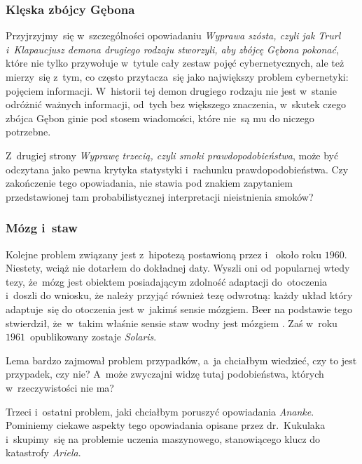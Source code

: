 \documentclass[10pt,t]{beamer}
\begin{document}
\begin{frame}
  \frametitle{Klęska zbójcy Gębona}


  Przyjrzyjmy~się w~szczególności opowiadaniu \textit{Wyprawa szósta, czyli
    jak Trurl i~Klapaucjusz demona drugiego rodzaju stworzyli, aby zbójcę
    Gębona pokonać}, które nie tylko przywołuje w~tytule cały zestaw pojęć
  cybernetycznych, ale też mierzy~się z~tym, co często przytacza~się jako
  największy problem cybernetyki: pojęciem informacji. W~historii tej demon
  drugiego rodzaju nie jest w~stanie odróżnić ważnych informacji, od~tych
  bez większego znaczenia, w~skutek czego zbójca Gębon ginie pod stosem
  wiadomości, które nie~są mu do niczego potrzebne.

  Z~drugiej strony \textit{Wyprawę trzecią, czyli smoki
    prawdopodobieństwa}, może być odczytana jako pewna krytyka statystyki
  i~rachunku prawdopodobieństwa. Czy zakończenie tego opowiadania, nie
  stawia pod znakiem zapytaniem przedstawionej tam probabilistycznej
  interpretacji nieistnienia smoków?

\end{frame}





\begin{frame}
  \frametitle{Mózg i~staw}


  Kolejne problem związany jest z~hipotezą postawioną przez
  i~
  około roku $1960$. Niestety, wciąż nie dotarłem do dokładnej daty.
  Wyszli oni od popularnej wtedy tezy, że~mózg jest obiektem posiadającym
  zdolność adaptacji do~otoczenia i~doszli do wniosku, że należy przyjąć
  również tezę odwrotną: każdy układ który adaptuje~się do otoczenia jest
  w~jakimś sensie mózgiem. Beer na podstawie tego stwierdził, że~w~takim
  właśnie sensie staw wodny jest mózgiem
  \parencite{Pickering-Cybernetics-in-Britain-Ver-2022}. Zaś w~roku
  $1961$~opublikowany zostaje \textit{Solaris}.

  Lema bardzo zajmował problem przypadków, a~ja chciałbym wiedzieć, czy to
  jest przypadek, czy nie? A~może zwyczajni widzę tutaj podobieństwa,
  których w~rzeczywistości nie ma?

  Trzeci i~ostatni problem, jaki chciałbym poruszyć opowiadania
  \textit{Ananke}. Pominiemy ciekawe aspekty tego opowiadania opisane
  przez dr.~Kukulaka i~skupimy~się na problemie uczenia maszynowego,
  stanowiącego klucz do katastrofy \textit{Ariela}.

\end{frame}
\end{document}
